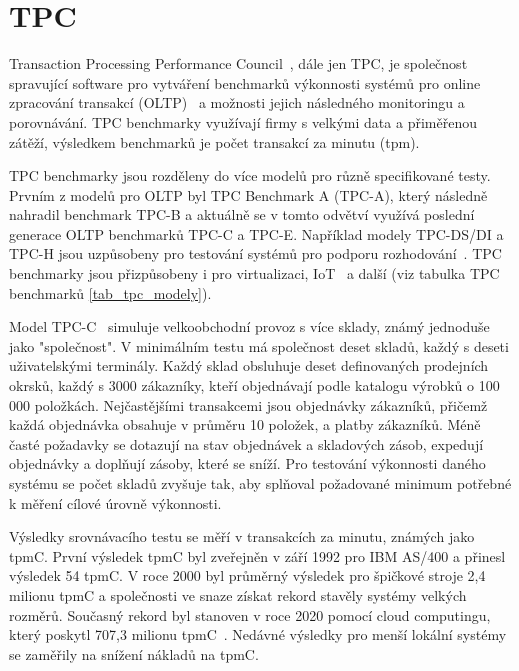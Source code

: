 \documentclass[czech,master,dept460,male,csharp,cpdeclaration]{diploma}
\begin{document}
	\section{TPC}
	
	Transaction Processing Performance Council~\cite{tpc}, dále jen TPC, je společnost spravující software pro vytváření benchmarků výkonnosti systémů pro online zpracování transakcí (OLTP)~\cite{oltp} a možnosti jejich následného monitoringu a porovnávání. TPC benchmarky využívají firmy s velkými data a přiměřenou zátěží, výsledkem benchmarků je počet transakcí za minutu (tpm).
	
	TPC benchmarky jsou rozděleny do více modelů pro různě specifikované testy. Prvním z modelů pro OLTP byl TPC Benchmark A (TPC-A), který následně nahradil benchmark TPC-B a aktuálně se v tomto odvětví využívá poslední generace OLTP benchmarků TPC-C a TPC-E. Například modely TPC-DS/DI a TPC-H jsou uzpůsobeny pro testování systémů pro podporu rozhodování~\cite{dss}. TPC benchmarky jsou přizpůsobeny i pro virtualizaci, IoT~\cite{iot} a další (viz tabulka TPC benchmarků \ref{tab_tpc_modely}).
	
	Model TPC-C~\cite{tpc-c} simuluje velkoobchodní provoz s více sklady, známý jednoduše jako "společnost". V minimálním testu má společnost deset skladů, každý s deseti uživatelskými terminály. Každý sklad obsluhuje deset definovaných prodejních okrsků, každý s 3000 zákazníky, kteří objednávají podle katalogu výrobků o 100 000 položkách. Nejčastějšími transakcemi jsou objednávky zákazníků, přičemž každá objednávka obsahuje v průměru 10 položek, a platby zákazníků. Méně časté požadavky se dotazují na stav objednávek a skladových zásob, expedují objednávky a doplňují zásoby, které se sníží. Pro testování výkonnosti daného systému se počet skladů zvyšuje tak, aby splňoval požadované minimum potřebné k měření cílové úrovně výkonnosti.
	
	Výsledky srovnávacího testu se měří v transakcích za minutu, známých jako tpmC. První výsledek tpmC byl zveřejněn v září 1992 pro IBM AS/400 a přinesl výsledek 54 tpmC. V roce 2000 byl průměrný výsledek pro špičkové stroje 2,4 milionu tpmC a společnosti ve snaze získat rekord stavěly systémy velkých rozměrů. Současný rekord byl stanoven v roce 2020 pomocí cloud computingu, který poskytl 707,3 milionu tpmC~\cite{tpc-c-top-result}. Nedávné výsledky pro menší lokální systémy se zaměřily na snížení nákladů na tpmC.
	
\end{document}

